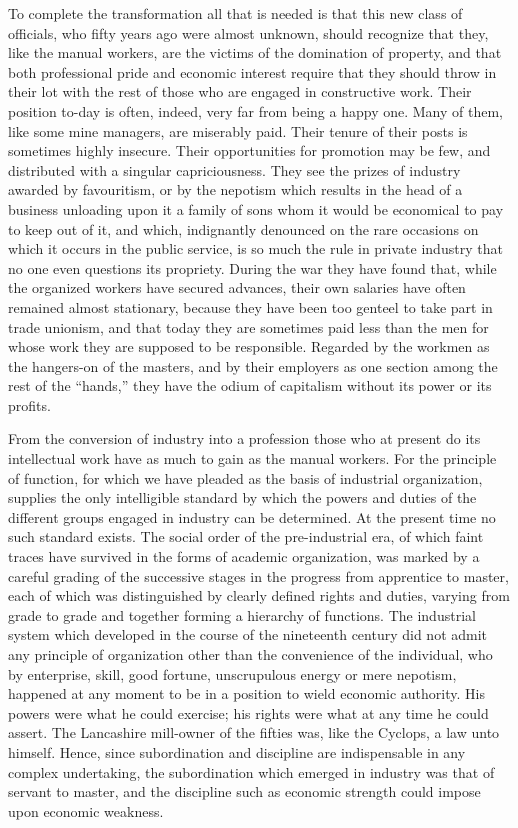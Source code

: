 \documentclass{book}
\begin{document}
To complete the transformation all that is needed is that this new class of officials, who fifty years ago were almost unknown, should recognize that they, like the manual workers, are the victims of the domination of property, and that both professional pride and economic interest require that they should throw in their lot with the rest of those who are engaged in constructive work. Their position to-day is often, indeed, very far from being a happy one. Many of them, like some mine managers, are miserably paid. Their tenure of their posts is sometimes highly insecure. Their opportunities for promotion may be few, and distributed with a singular capriciousness. They see the prizes of industry awarded by favouritism, or by the nepotism which results in the head of a business unloading upon it a family of sons whom it would be economical to pay to keep out of it, and which, indignantly denounced on the rare occasions on which it occurs in the public service, is so much the rule in private industry that no one even questions its propriety. During the war they have found that, while the organized workers have secured advances, their own salaries have often remained almost stationary, because they have been too genteel to take part in trade unionism, and that today they are sometimes paid less than the men for whose work they are supposed to be responsible. Regarded by the workmen as the hangers-on of the masters, and by their employers as one section among the rest of the “hands,” they have the odium of capitalism without its power or its profits.

From the conversion of industry into a profession those who at present do its intellectual work have as much to gain as the manual workers. For the principle of function, for which we have pleaded as the basis of industrial organization, supplies the only intelligible standard by which the powers and duties of the different groups engaged in industry can be determined. At the present time no such standard exists. The social order of the pre-industrial era, of which faint traces have survived in the forms of academic organization, was marked by a careful grading of the successive stages in the progress from apprentice to master, each of which was distinguished by clearly defined rights and duties, varying from grade to grade and together forming a hierarchy of functions. The industrial system which developed in the course of the nineteenth century did not admit any principle of organization other than the convenience of the individual, who by enterprise, skill, good fortune, unscrupulous energy or mere nepotism, happened at any moment to be in a position to wield economic authority. His powers were what he could exercise; his rights were what at any time he could assert. The Lancashire mill-owner of the fifties was, like the Cyclops, a law unto himself. Hence, since subordination and discipline are indispensable in any complex undertaking, the subordination which emerged in industry was that of servant to master, and the discipline such as economic strength could impose upon economic weakness.
\end{document}
